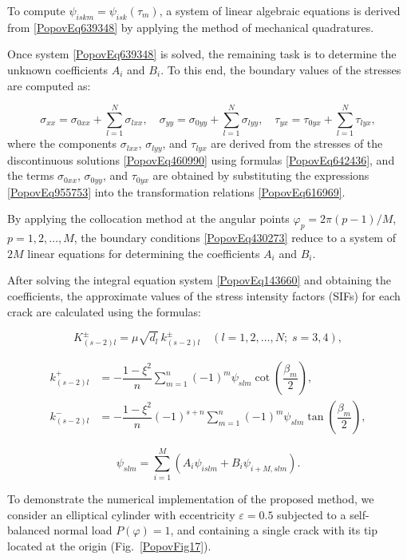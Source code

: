To compute $\psi_{iskm} = \psi_{isk}(\tau_m)$, a system of linear algebraic equations is derived from \eqref{PopovEq639348} by applying the method of mechanical quadratures.

Once system \eqref{PopovEq639348} is solved, the remaining task is to determine the unknown coefficients $A_i$ and $B_i$. To this end, the boundary values of the stresses are computed as:

\begin{equation} \label{PopovEq185218}
	\sigma_{xx} = \sigma_{0xx} + \sum_{l=1}^{N} \sigma_{lxx}, \quad
	\sigma_{yy} = \sigma_{0yy} + \sum_{l=1}^{N} \sigma_{lyy}, \quad
	\tau_{yx} = \tau_{0yx} + \sum_{l=1}^{N} \tau_{lyx},
\end{equation}
where the components $\sigma_{lxx}$, $\sigma_{lyy}$, and $\tau_{lyx}$ are derived from the stresses of the discontinuous solutions \eqref{PopovEq460990} using formulas \eqref{PopovEq642436}, and the terms $\sigma_{0xx}$, $\sigma_{0yy}$, and $\tau_{0yx}$ are obtained by substituting the expressions \eqref{PopovEq955753} into the transformation relations \eqref{PopovEq616969}.

By applying the collocation method at the angular points $\varphi_p = 2\pi(p - 1)/M$, $p = 1, 2, \dots, M$, the boundary conditions \eqref{PopovEq430273} reduce to a system of $2M$ linear equations for determining the coefficients $A_i$ and $B_i$.

After solving the integral equation system \eqref{PopovEq143660} and obtaining the coefficients, the approximate values of the stress intensity factors (SIFs) for each crack are calculated using the formulas:

\begin{equation} \label{31.58)}
	K_{(s-2)l}^{\pm} = \mu \sqrt{d_l} \, k_{(s-2)l}^{\pm} \quad (l = 1, 2, \dots, N;\; s = 3, 4),
\end{equation}

\begin{align*}
	k_{(s-2)l}^{+} &= -\dfrac{1 - \xi^2}{n} \displaystyle\sum_{m=1}^{n} (-1)^m \psi_{slm} \cot\left( \dfrac{\beta_m}{2} \right), \\[1ex]
	k_{(s-2)l}^{-} &= -\dfrac{1 - \xi^2}{n} (-1)^{s+n} \displaystyle\sum_{m=1}^{n} (-1)^m \psi_{slm} \tan\left( \dfrac{\beta_m}{2} \right),
\end{align*}

\[
\psi_{slm} = \sum_{i=1}^{M} \left( A_i \psi_{islm} + B_i \psi_{i+M,slm} \right).
\]

To demonstrate the numerical implementation of the proposed method, we consider an elliptical cylinder with eccentricity $\varepsilon = 0.5$ subjected to a self-balanced normal load $P(\varphi) = 1$, and containing a single crack with its tip located at the origin (Fig.~\ref{PopovFig17}).


